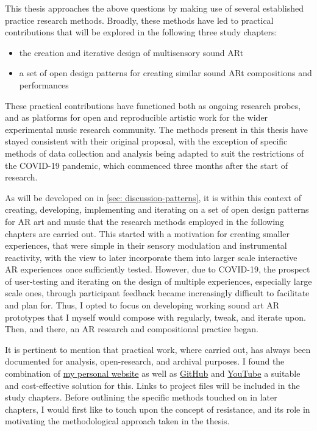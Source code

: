 This thesis approaches the above questions by making use of several established practice research methods. Broadly, these methods have led to practical contributions that will be explored in the following three study chapters: 
\begin{itemize}
    \item the creation and iterative design of multisensory sound ARt
    \item a set of open design patterns for creating similar sound ARt compositions and performances
\end{itemize}
These practical contributions have functioned both as ongoing research probes, and as platforms for open and reproducible artistic work for the wider experimental music research community. The methods present in this thesis have stayed consistent with their original proposal, with the exception of specific methods of data collection and analysis being adapted to suit the restrictions of the COVID-19 pandemic, which commenced three months after the start of research. 

As will be developed on in \autoref{sec: discussion-patterns}, it is within this context of creating, developing, implementing and iterating on a set of open design patterns for AR art and music that the research methods employed in the following chapters are carried out. This started with a motivation for creating smaller experiences, that were simple in their sensory modulation and instrumental reactivity, with the view to later incorporate them into larger scale interactive AR experiences once sufficiently tested. However, due to COVID-19, the prospect of user-testing and iterating on the design of multiple experiences, especially large scale ones, through participant feedback became increasingly difficult to facilitate and plan for. Thus, I opted to focus on developing working sound art AR prototypes that I myself would compose with regularly, tweak, and iterate upon. Then, and there, an AR research and compositional practice began.

It is pertinent to mention that practical work, where carried out, has always been documented for analysis, open-research, and archival purposes. I found the combination of \href{https://sambilbow.github.io}{my personal website} as well as \href{https://github.com/sambilbow}{GitHub} and \href{https://youtube.com/@sambilbow}{YouTube} a suitable and cost-effective solution for this. Links to project files will be included in the study chapters. Before outlining the specific methods touched on in later chapters, I would first like to touch upon the concept of resistance, and its role in motivating the methodological approach taken in the thesis.




